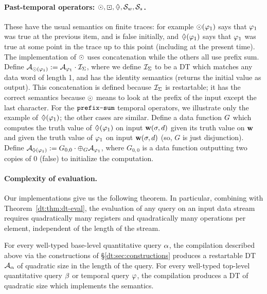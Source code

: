 \paragraph*{Past-temporal operators: $\odot, \boxdot, \;\cdot\hspace{-0.52em}\Diamond, \mathbin{\mathcal{S}_w}, \mathbin{\mathcal{S}_s}{}$.}
These have the usual semantics on finite traces: for example $\odot(\varphi_1)$ says that $\varphi_1$ was true at the previous item, and is false initially, and $\;\cdot\hspace{-0.52em}\Diamond(\varphi_1)$ says that $\varphi_1$ was true at some point in the trace up to this point (including at the present time). The implementation of $\odot$ uses concatenation while the others all use prefix sum. Define $\mathcal{A}_{\odot(\varphi_1)} := \mathcal{A}_{\varphi_1} \cdot \mathcal{I}_{\Sigma}$, where we define $\mathcal{I}_{\Sigma}$ to be a DT which matches any data word of length 1, and has the identity semantics (returns the initial value as output). This concatenation is defined because $\mathcal{I}_{\Sigma}$ is restartable; it has the correct semantics because $\odot$ means to look at the prefix of the input except the last character.
For the $\texttt{prefix-sum}$ temporal operators, we illustrate only the example of $\;\cdot\hspace{-0.52em}\Diamond(\varphi_1)$; the other cases are similar. Define a data function $G$ which computes the truth value of $\;\cdot\hspace{-0.52em}\Diamond(\varphi_1)$ on input $\textbf{w} (\sigma, d)$ given its truth value on $\textbf{w}$ and given the truth value of $\varphi_1$ on input $\textbf{w} (\sigma, d)$ (so, $G$ is just disjunction). Define $\DT_{\eventuallyT(\tq_1)} := \concat{G_{0,0}}{\prefixsum{\DT_{\tq_1}}{\DF}}$, where $G_{0,0}$ is a data function outputting two copies of $0$ (false) to initialize the computation.

\paragraph*{Complexity of \QREpast{} evaluation.}
Our implementations give us the following theorem. In particular, combining with Theorem~\ref{dt:thm:dt-eval}, the evaluation of any query on an input data stream requires quadratically many registers and quadratically many operations per element, independent of the length of the stream.

\begin{theorem}
For every well-typed base-level quantitative query $\alpha$, the compilation described above via the constructions of \S\ref{dt:sec:constructions} produces a restartable DT $\mathcal{A}_\alpha$ of quadratic size in the length of the query. For every well-typed top-level quantitative query $\beta$ or temporal query $\varphi$, the compilation produces a DT of quadratic size which implements the semantics.
\end{theorem}

